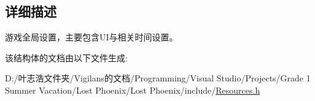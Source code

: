 \begin{DoxyCompactItemize}
\begin{tabbing}
\end{tabbing}\end{DoxyCompactItemize}


\subsection{详细描述}
游戏全局设置，主要包含\+U\+I与相关时间设置。 



该结构体的文档由以下文件生成\+:\begin{DoxyCompactItemize}
\item 
D\+:/叶志浩文件夹/\+Vigilans的文档/\+Programming/\+Visual Studio/\+Projects/\+Grade 1 Summer Vacation/\+Lost Phoenix/\+Lost Phoenix/include/\hyperlink{_resources_8h}{Resources.\+h}\end{DoxyCompactItemize}
